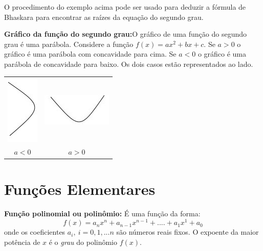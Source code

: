 O procedimento do exemplo acima pode ser usado para deduzir a fórmula de Bhaskara para encontrar
as raízes da equação do segundo grau.


\begin{multicols}{2}

\noindent \textbf{Gráfico da função do segundo grau:}O gráfico de uma função do segundo grau é uma parábola. Considere a função
$f(x)=ax^2+bx+c$. Se $a>0$ o gráfico é uma parábola com concavidade para cima. Se $a<0$ o gráfico é uma parábola de concavidade para baixo. Os dois casos estão representados ao lado.

\columnbreak


\begin{center}
\begin{tabular}{cc}
\includegraphics{./chapters/preliminares/imgs/SadHappy.jpg} & \includegraphics{./chapters/preliminares/imgs/Happy.jpg} \\
$a<0$ & $a>0$
\end{tabular}
\end{center}
\end{multicols}

\section{Funções Elementares}


\noindent\textbf{Função polinomial ou polinômio:}  É uma função da forma:
\begin{equation}\label{polinomio}f(x)=a_nx^n+a_{n-1}x^{n-1}+....+a_1x^{1}+a_0\end{equation}
onde os coeficientes $a_i,\ i=0,1,...n$ são números reais fixos. O expoente da maior potência de $x$ é o \textit{grau} do polinômio $f(x)$.

